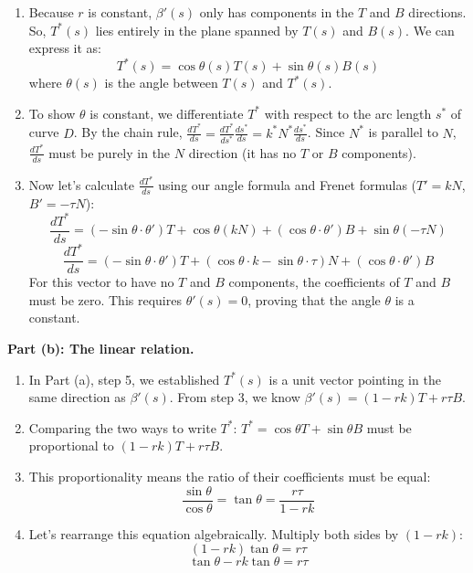 \begin{solution}
\begin{enumerate}
    \item Because $r$ is constant, $\beta'(s)$ only has components in the $T$ and $B$ directions. So, $T^*(s)$ lies entirely in the plane spanned by $T(s)$ and $B(s)$. We can express it as:
       \[ T^*(s) = \cos \theta(s) T(s) + \sin \theta(s) B(s) \]
       where $\theta(s)$ is the angle between $T(s)$ and $T^*(s)$.

    \item To show $\theta$ is constant, we differentiate $T^*$ with respect to the arc length $s^*$ of curve $D$. By the chain rule, $\frac{d T^*}{d s} = \frac{d T^*}{d s^*} \frac{d s^*}{d s} = k^* N^* \frac{d s^*}{d s}$. 
       Since $N^*$ is parallel to $N$, $\frac{d T^*}{d s}$ must be purely in the $N$ direction (it has no $T$ or $B$ components).

    \item Now let's calculate $\frac{d T^*}{d s}$ using our angle formula and Frenet formulas ($T' = kN$, $B' = -\tau N$):
       \[ \frac{d T^*}{d s} = (-\sin \theta \cdot \theta') T + \cos \theta (kN) + (\cos \theta \cdot \theta') B + \sin \theta (-\tau N) \]
       \[ \frac{d T^*}{d s} = (-\sin \theta \cdot \theta') T + (\cos \theta \cdot k - \sin \theta \cdot \tau) N + (\cos \theta \cdot \theta') B \]
       For this vector to have no $T$ and $B$ components, the coefficients of $T$ and $B$ must be zero. This requires $\theta'(s) = 0$, proving that the angle $\theta$ is a constant.
\end{enumerate}

\par\vspace{1em}
\textbf{Part (b): The linear relation.}
\par\vspace{1em}
\begin{enumerate}
    \item In Part (a), step 5, we established $T^*(s)$ is a unit vector pointing in the same direction as $\beta'(s)$. From step 3, we know $\beta'(s) = (1 - rk) T + r\tau B$. 

    \item Comparing the two ways to write $T^*$:
       $T^* = \cos \theta T + \sin \theta B$ must be proportional to $(1 - rk) T + r\tau B$.

    \item This proportionality means the ratio of their coefficients must be equal:
       \[ \frac{\sin \theta}{\cos \theta} = \tan \theta = \frac{r\tau}{1 - rk} \]

    \item Let's rearrange this equation algebraically. Multiply both sides by $(1 - rk)$:
       \[ (1 - rk) \tan \theta = r\tau \]
       \[ \tan \theta - rk \tan \theta = r\tau \]


\end{enumerate}
\end{solution}
